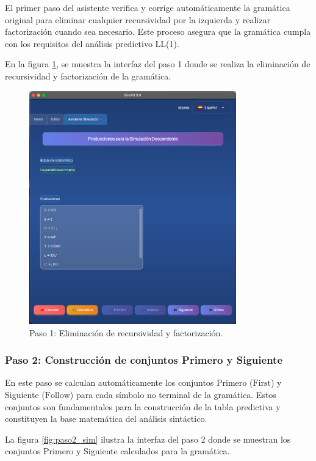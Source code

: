 El primer paso del asistente verifica y corrige automáticamente la gramática original para eliminar cualquier recursividad por la izquierda y realizar factorización cuando sea necesario. Este proceso asegura que la gramática cumpla con los requisitos del análisis predictivo LL(1).

En la figura \ref{fig:paso1_sim}, se muestra la interfaz del paso 1 donde se realiza la eliminación de recursividad y factorización de la gramática.

\needspace{6cm}
\begin{figure}[H]
\centering
\includegraphics[width=0.8\textwidth]{figuras2/simulador/paso1_recursividad_factorizacion.png}
\caption{Paso 1: Eliminación de recursividad y factorización.}
\label{fig:paso1_sim}
\end{figure}

\subsubsection{Paso 2: Construcción de conjuntos Primero y Siguiente}

En este paso se calculan automáticamente los conjuntos Primero ($\text{First}$) y Siguiente ($\text{Follow}$) para cada símbolo no terminal de la gramática. Estos conjuntos son fundamentales para la construcción de la tabla predictiva y constituyen la base matemática del análisis sintáctico.

La figura \ref{fig:paso2_sim} ilustra la interfaz del paso 2 donde se muestran los conjuntos Primero y Siguiente calculados para la gramática.

